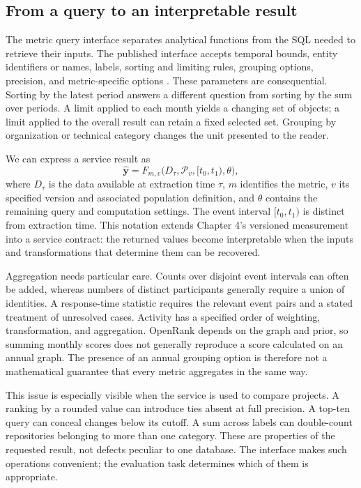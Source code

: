 \subsection{From a query to an interpretable result}
The metric query interface separates analytical functions from the SQL needed to retrieve their inputs. The published interface accepts temporal bounds, entity identifiers or names, labels, sorting and limiting rules, grouping options, precision, and metric-specific options \citep[Table 8]{wang2026digger}. These parameters are consequential. Sorting by the latest period answers a different question from sorting by the sum over periods. A limit applied to each month yields a changing set of objects; a limit applied to the overall result can retain a fixed selected set. Grouping by organization or technical category changes the unit presented to the reader.

We can express a service result as
\begin{equation}
 \widehat{\boldsymbol y}
 =F_{m,v}\bigl(D_{\tau},\mathcal P_v,[t_0,t_1),\theta\bigr),
 \label{eq:ch6-service}
\end{equation}
where \(D_{\tau}\) is the data available at extraction time \(\tau\), \(m\) identifies the metric, \(v\) its specified version and associated population definition, and \(\theta\) contains the remaining query and computation settings. The event interval \([t_0,t_1)\) is distinct from extraction time. This notation extends Chapter 4's versioned measurement into a service contract: the returned values become interpretable when the inputs and transformations that determine them can be recovered.

Aggregation needs particular care. Counts over disjoint event intervals can often be added, whereas numbers of distinct participants generally require a union of identities. A response-time statistic requires the relevant event pairs and a stated treatment of unresolved cases. Activity has a specified order of weighting, transformation, and aggregation. OpenRank depends on the graph and prior, so summing monthly scores does not generally reproduce a score calculated on an annual graph. The presence of an annual grouping option is therefore not a mathematical guarantee that every metric aggregates in the same way.

This issue is especially visible when the service is used to compare projects. A ranking by a rounded value can introduce ties absent at full precision. A top-ten query can conceal changes below its cutoff. A sum across labels can double-count repositories belonging to more than one category. These are properties of the requested result, not defects peculiar to one database. The interface makes such operations convenient; the evaluation task determines which of them is appropriate.

